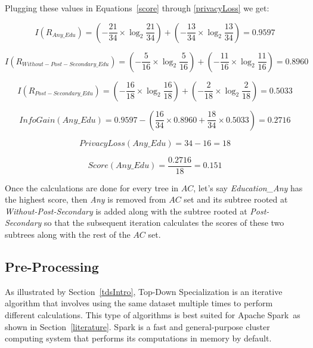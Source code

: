 \documentclass[11pt]{article}       %
\begin{document}
Plugging these values in Equations~\ref{score} through \ref{privacyLoss} we get:

\[ I (R_{Any\_Edu}) = (- \frac{21}{34} \times \log_2 \frac{21}{34}) + (- \frac{13}{34} \times \log_2 \frac{13}{34}) = 0.9597 \]

\[ I (R_{Without-Post-Secondary\_Edu}) = (- \frac{5}{16} \times \log_2 \frac{5}{16}) + (- \frac{11}{16} \times \log_2 \frac{11}{16}) = 0.8960 \]

\[ I (R_{Post-Secondary\_Edu}) = (- \frac{16}{18} \times \log_2 \frac{16}{18}) + (- \frac{2}{18} \times \log_2 \frac{2}{18}) = 0.5033 \]

\[ InfoGain(Any\_Edu) = 0.9597 - (\frac{16}{34} \times 0.8960 + \frac{18}{34} \times 0.5033) = 0.2716 \]

\[ PrivacyLoss(Any\_Edu) = 34 - 16 = 18 \]

\[ Score(Any\_Edu) = \frac{0.2716}{18} = 0.151 \]

Once the calculations are done for every tree in $AC$, let's say \emph{Education\_Any} has the highest score, then \emph{Any} is removed from $AC$ set and its subtree rooted at \emph{Without-Post-Secondary} is added along with the subtree rooted at \emph{Post-Secondary} so that the subsequent iteration calculates the scores of these two subtrees along with the rest of the $AC$ set.

\subsection{Pre-Processing}

As illustrated by Section~\ref{tdsIntro}, Top-Down Specialization is an iterative algorithm that involves using the same dataset multiple times to perform different calculations. This type of algorithms is best suited for Apache Spark\texttrademark~as shown in Section~\ref{literature}. Spark is a fast and general-purpose cluster computing system that performs its computations in memory by default.
\end{document}
